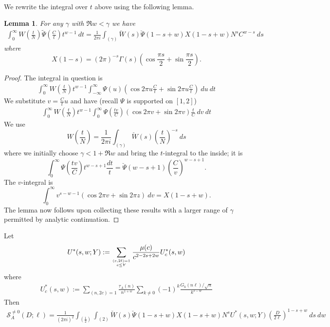 \documentclass[12pt]{amsart}
\newtheorem{lemma}{Lemma}
\begin{document}
	We rewrite the integral over $t$  above using the following lemma.
	\begin{lemma} \label{lemma:rewritten integral} 
		For any $\gamma$ with $\Re w< \gamma $ we have
		\begin{eqnarray*}
			\int_0^\infty W\left(\frac t N\right) \tilde{\Psi}\left(\frac{C}{ t}\right) t^{w-1}~dt
			= \frac1{2\pi i} \int_{(\gamma)} \breve{W}(s)\breve{\Psi}(1-s+w) X(1-s+w)N^sC^{w-s}
			~ds
		\end{eqnarray*}
		where 
		$$X(1-s)=(2\pi)^{-s}\Gamma(s)\left( \cos\frac{\pi s}{2}+\sin\frac{\pi s}{2}\right).$$ 
	\end{lemma}
	
	\begin{proof}
		The integral in question is 
		\begin{eqnarray*}
			\int_0^\infty  W\left(\frac t N\right) t^{w-1} \int_{-\infty}^\infty \Psi(u) (\cos 2\pi u \frac{C}{ t} +\sin 2\pi u \frac{C}{ t}) ~du ~dt
		\end{eqnarray*}
		We substitute $v=\frac{C}{ t} u$ and have (recall $\Psi$ is supported on $[1,2]$)
		\begin{eqnarray*}
			\int_0^\infty  W\left(\frac t N\right) t^{w-1} \int_0^\infty \Psi\left(\frac{t v}{C}\right) (\cos 2\pi v +\sin 2\pi v)
			\frac{ t}{C} ~dv ~dt
		\end{eqnarray*}
		We use 
		$$  W\left(\frac t N\right)=\frac{1}{2\pi i}\int_{( \gamma )} \breve W(s) \left(\frac tN\right)^{-s} ~ds$$
		where we initially choose $\gamma < 1+\Re w$
		and bring  the $t$-integral to the inside; it  is
		$$\int_0^\infty \Psi\left(\frac{ t v}{C}\right) t^{w-s+1}\frac{dt}{t}=
		\breve\Psi(w-s+1) \left(\frac{C}{ v}\right) ^{w-s+1}.$$
		The $v$-integral is 
		$$\int_0^\infty v^ {s-w-1}(\cos 2\pi v+\sin 2\pi z) ~dv=  X(1-s+w).$$
		The lemma now follows upon collecting these results with a larger range of $\gamma$ permitted by analytic continuation. 
	\end{proof}
	
	
	Let
	\begin{eqnarray*}
		U^\ast(s,w;Y):=  \sum_{(c,2\ell)=1\atop c\le Y}  \frac{\mu(c)}{c^{2-2s+2w}}U^\ast_c(s,w)
	\end{eqnarray*}
	where
	\begin{eqnarray*}
		U^\ast_c(s,w):= \sum_{(n,2c)=1}  \frac{\tau_A(n)}{n^{1+w}} 
		\sum_{k\ne 0}  (-1)^k \frac{G_k(n\ell)/\sqrt{n}}{ k^{s-w}}
	\end{eqnarray*}
	Then  
	\begin{eqnarray*}
		\mathcal S_A^{\ne 0}(D;\ell) = \frac{1}{(2\pi i)^2} \int_{(\frac 12 )}   \int_{( 2 )} \breve{W}(s)\breve{\Psi}(1-s+w) X(1-s+w)N^s  U^\ast(s,w;Y) \left( \frac{D}{2\ell}\right)^{1-s+w}
		~ds~dw 
	\end{eqnarray*}
	
\end{document}
